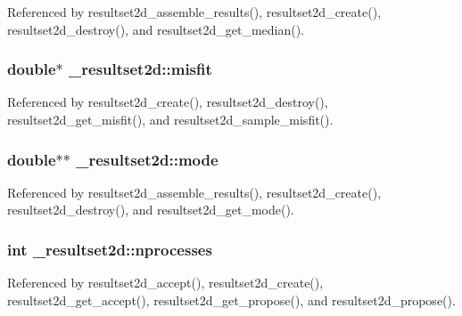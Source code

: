 Referenced by resultset2d\+\_\+assemble\+\_\+results(), resultset2d\+\_\+create(), resultset2d\+\_\+destroy(), and resultset2d\+\_\+get\+\_\+median().

\subsubsection[{\texorpdfstring{misfit}{misfit}}]{\setlength{\rightskip}{0pt plus 5cm}double$\ast$ \+\_\+resultset2d\+::misfit}\hypertarget{struct__resultset2d_a032409aaede183d9c6954ee4ea7d1271}{}\label{struct__resultset2d_a032409aaede183d9c6954ee4ea7d1271}


Referenced by resultset2d\+\_\+create(), resultset2d\+\_\+destroy(), resultset2d\+\_\+get\+\_\+misfit(), and resultset2d\+\_\+sample\+\_\+misfit().

\subsubsection[{\texorpdfstring{mode}{mode}}]{\setlength{\rightskip}{0pt plus 5cm}double$\ast$$\ast$ \+\_\+resultset2d\+::mode}\hypertarget{struct__resultset2d_a9621b34dfac4929e8fa146be94c19e46}{}\label{struct__resultset2d_a9621b34dfac4929e8fa146be94c19e46}


Referenced by resultset2d\+\_\+assemble\+\_\+results(), resultset2d\+\_\+create(), resultset2d\+\_\+destroy(), and resultset2d\+\_\+get\+\_\+mode().

\subsubsection[{\texorpdfstring{nprocesses}{nprocesses}}]{\setlength{\rightskip}{0pt plus 5cm}int \+\_\+resultset2d\+::nprocesses}\hypertarget{struct__resultset2d_a7c252fa7603e67e06f2020b73eb1d15d}{}\label{struct__resultset2d_a7c252fa7603e67e06f2020b73eb1d15d}


Referenced by resultset2d\+\_\+accept(), resultset2d\+\_\+create(), resultset2d\+\_\+get\+\_\+accept(), resultset2d\+\_\+get\+\_\+propose(), and resultset2d\+\_\+propose().

